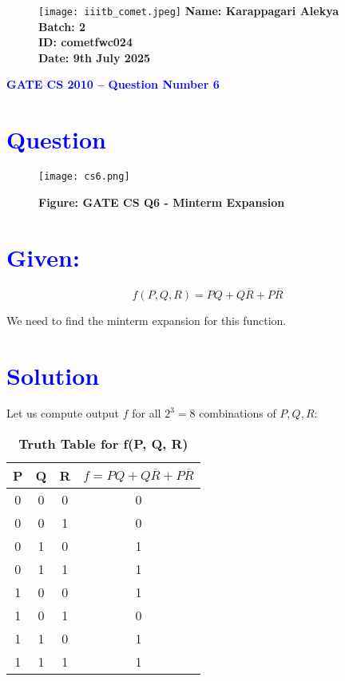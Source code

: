 \documentclass[twocolumn]{article}
\begin{document}
\begin{figure}[t]
    \texttt{[image: iiitb\_comet.jpeg]} %
    \textbf{Name: Karappagari Alekya} \\
    \textbf{Batch: 2} \\
    \textbf{ID: cometfwc024} \\
    \textbf{Date: 9th July 2025}
\end{figure}

\begin{center}
    {\LARGE \textbf{\textcolor{blue}{GATE CS 2010 – Question Number 6}}}
\end{center}

\section*{\textcolor{blue}{Question}}

\begin{figure}[h]
    \centering
    \texttt{[image: cs6.png]}
    \caption*{\textbf{Figure: GATE CS Q6 - Minterm Expansion}}
\end{figure}

\section*{\textcolor{blue}{Given:}}

\[
f(P, Q, R) = PQ + Q\overline{R} + P\overline{R}
\]

We need to find the minterm expansion for this function.

\section*{\textcolor{blue}{Solution}}

Let us compute output \( f \) for all \( 2^3 = 8 \) combinations of \( P, Q, R \):

\begin{table}[h]
\centering
\renewcommand{\arraystretch}{1.2}
\begin{tabular}{|c|c|c|c|}
\hline
P & Q & R & $f = PQ + Q\overline{R} + P\overline{R}$ \\
\hline
0 & 0 & 0 & 0 \\
0 & 0 & 1 & 0 \\
0 & 1 & 0 & 1 \\
0 & 1 & 1 & 1 \\
1 & 0 & 0 & 1 \\
1 & 0 & 1 & 0 \\
1 & 1 & 0 & 1 \\
1 & 1 & 1 & 1 \\
\hline
\end{tabular}
\caption*{\textbf{Truth Table for f(P, Q, R)}}
\end{table}
\end{document}
